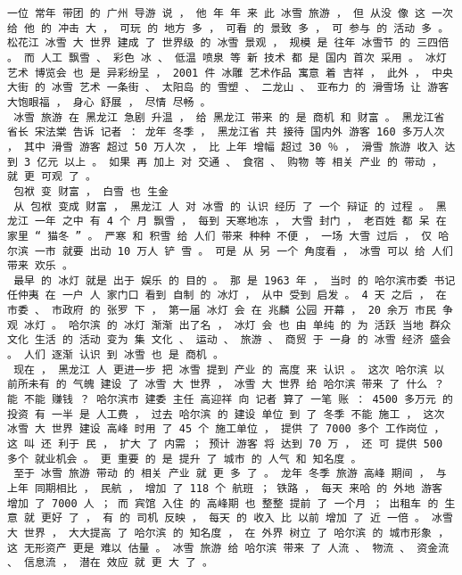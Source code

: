 \documentclass{article}
\begin{document}
\begin{Verbatim}[commandchars=\\\{\}]
 一位 常年 带团 的 广州 导游 说 ， 他 年 年 来 此 冰雪 旅游 ， 但 从没 像 这 一次 给 他 的 冲击 大 ， 可玩 的 地方 多 ， 可看 的 景致 多 ， 可 参与 的 活动 多 。 松花江 冰雪 大 世界 建成 了 世界级 的 冰雪 景观 ， 规模 是 往年 冰雪节 的 三四倍 。 而 人工 飘雪 、 彩色 冰 、 低温 喷泉 等 新 技术 都 是 国内 首次 采用 。 冰灯 艺术 博览会 也 是 异彩纷呈 ， 2001 件 冰雕 艺术作品 寓意 着 吉祥 ， 此外 ， 中央大街 的 冰雪 艺术 一条街 、 太阳岛 的 雪塑 、 二龙山 、 亚布力 的 滑雪场 让 游客 大饱眼福 ， 身心 舒展 ， 尽情 尽畅 。 
 冰雪 旅游 在 黑龙江 急剧 升温 ， 给 黑龙江 带来 的 是 商机 和 财富 。 黑龙江省 省长 宋法棠 告诉 记者 ： 龙年 冬季 ， 黑龙江省 共 接待 国内外 游客 160 多万人次 ， 其中 滑雪 游客 超过 50 万人次 ， 比 上年 增幅 超过 30 ％ ， 滑雪 旅游 收入 达到 3 亿元 以上 。 如果 再 加上 对 交通 、 食宿 、 购物 等 相关 产业 的 带动 ， 就 更 可观 了 。 
 包袱 变 财富 ， 白雪 也 生金 
 从 包袱 变成 财富 ， 黑龙江 人 对 冰雪 的 认识 经历 了 一个 辩证 的 过程 。 黑龙江 一年 之中 有 4 个 月 飘雪 ， 每到 天寒地冻 ， 大雪 封门 ， 老百姓 都 呆 在 家里 “ 猫冬 ” 。 严寒 和 积雪 给 人们 带来 种种 不便 ， 一场 大雪 过后 ， 仅 哈尔滨 一市 就要 出动 10 万人 铲 雪 。 可是 从 另 一个 角度看 ， 冰雪 可以 给 人们 带来 欢乐 。 
 最早 的 冰灯 就是 出于 娱乐 的 目的 。 那 是 1963 年 ， 当时 的 哈尔滨市委 书记 任仲夷 在 一户 人 家门口 看到 自制 的 冰灯 ， 从中 受到 启发 。 4 天 之后 ， 在 市委 、 市政府 的 张罗 下 ， 第一届 冰灯 会 在 兆麟 公园 开幕 ， 20 余万 市民 争观 冰灯 。 哈尔滨 的 冰灯 渐渐 出了名 ， 冰灯 会 也 由 单纯 的 为 活跃 当地 群众 文化 生活 的 活动 变为 集 文化 、 运动 、 旅游 、 商贸 于 一身 的 冰雪 经济 盛会 。 人们 逐渐 认识 到 冰雪 也 是 商机 。 
 现在 ， 黑龙江 人 更进一步 把 冰雪 提到 产业 的 高度 来 认识 。 这次 哈尔滨 以 前所未有 的 气魄 建设 了 冰雪 大 世界 ， 冰雪 大 世界 给 哈尔滨 带来 了 什么 ？ 能 不能 赚钱 ？ 哈尔滨市 建委 主任 高迎祥 向 记者 算了 一笔 账 ： 4500 多万元 的 投资 有 一半 是 人工费 ， 过去 哈尔滨 的 建设 单位 到 了 冬季 不能 施工 ， 这次 冰雪 大 世界 建设 高峰 时用 了 45 个 施工单位 ， 提供 了 7000 多个 工作岗位 ， 这 叫 还 利于 民 ， 扩大 了 内需 ； 预计 游客 将 达到 70 万 ， 还 可 提供 500 多个 就业机会 。 更 重要 的 是 提升 了 城市 的 人气 和 知名度 。 
 至于 冰雪 旅游 带动 的 相关 产业 就 更 多 了 。 龙年 冬季 旅游 高峰 期间 ， 与 上年 同期相比 ， 民航 ， 增加 了 118 个 航班 ； 铁路 ， 每天 来哈 的 外地 游客 增加 了 7000 人 ； 而 宾馆 入住 的 高峰期 也 整整 提前 了 一个月 ； 出租车 的 生意 就 更好 了 ， 有 的 司机 反映 ， 每天 的 收入 比 以前 增加 了 近 一倍 。 冰雪 大 世界 ， 大大提高 了 哈尔滨 的 知名度 ， 在 外界 树立 了 哈尔滨 的 城市形象 ， 这 无形资产 更是 难以 估量 。 冰雪 旅游 给 哈尔滨 带来 了 人流 、 物流 、 资金流 、 信息流 ， 潜在 效应 就 更 大 了 。 

\end{Verbatim}
\end{document}
